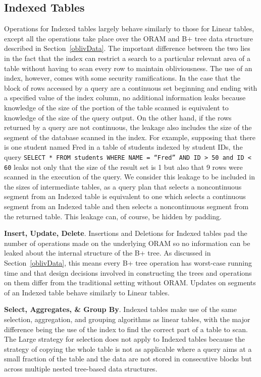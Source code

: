 \documentclass[letterpaper,twocolumn,10pt]{article}
\begin{document}
\subsection{Indexed Tables}
Operations for Indexed tables largely behave similarly to those for Linear tables, except all the operations take place over the ORAM and B+ tree data structure described in Section~\ref{oblivData}. The important difference between the two lies in the fact that the index can restrict a search to a particular relevant area of a table without having to scan every row to maintain obliviousness. The use of an index, however, comes with some security ramifications. In the case that the block of rows accessed by a query are a continuous set beginning and ending with a specified value of the index column, no additional information leaks because knowledge of the size of the portion of the table scanned is equivalent to knowledge of the size of the query output. On the other hand, if the rows returned by a query are not continuous, the leakage also includes the size of the segment of the database scanned in the index. For example, supposing that there is one student named Fred in a table of students indexed by student IDs, the query \texttt{SELECT * FROM students WHERE NAME = ``Fred'' AND ID > 50 and ID < 60} leaks not only that the size of the result set is 1 but also that 9 rows were scanned in the execution of the query. We consider this leakage to be included in the sizes of intermediate tables, as a query plan that selects a noncontinuous segment from an Indexed table is equivalent to one which selects a continuous segment from an Indexed table and then selects a noncontinuous segment from the returned table. This leakage can, of course, be hidden by padding.

  \noindent \textbf{Insert, Update, Delete}.
  Insertions and Deletions for Indexed tables pad the number of operations made on the underlying ORAM so no information can be leaked about the internal structure of the B+ tree. As discussed in Section~\ref{oblivData}, this means every B+ tree operation has worst-case running time and that design decisions involved in constructing the trees and operations on them differ from the traditional setting without ORAM. Updates on segments of an Indexed table behave similarly to Linear tables.

  \noindent \textbf{Select, Aggregates, \& Group By}.
  Indexed tables make use of the same selection, aggregation, and grouping algorithms as linear tables, with the major difference being the use of the index to find the correct part of a table to scan. The Large strategy for selection does not apply to Indexed tables because the strategy of copying the whole table is not as applicable where a query aims at a small fraction of the table and the data are not stored in consecutive blocks but across multiple nested tree-based data structures.
\end{document}
